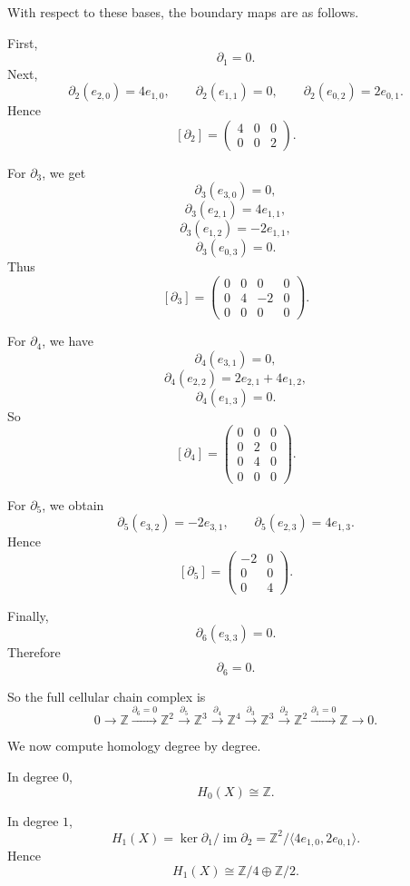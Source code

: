 \begin{solution}
With respect to these bases, the boundary maps are as follows.

First,
\[
\partial_1=0.
\]
Next,
\[
\partial_2(e_{2,0})=4e_{1,0},
\qquad
\partial_2(e_{1,1})=0,
\qquad
\partial_2(e_{0,2})=2e_{0,1}.
\]
Hence
\[
[\partial_2]
=
\begin{pmatrix}
	4 & 0 & 0\\
	0 & 0 & 2
\end{pmatrix}.
\]

For \(\partial_3\), we get
\[
\partial_3(e_{3,0})=0,
\]
\[
\partial_3(e_{2,1})=4e_{1,1},
\]
\[
\partial_3(e_{1,2})=-2e_{1,1},
\]
\[
\partial_3(e_{0,3})=0.
\]
Thus
\[
[\partial_3]
=
\begin{pmatrix}
	0 & 0 & 0 & 0\\
	0 & 4 & -2 & 0\\
	0 & 0 & 0 & 0
\end{pmatrix}.
\]

For \(\partial_4\), we have
\[
\partial_4(e_{3,1})=0,
\]
\[
\partial_4(e_{2,2})
=
2e_{2,1}+4e_{1,2},
\]
\[
\partial_4(e_{1,3})=0.
\]
So
\[
[\partial_4]
=
\begin{pmatrix}
	0 & 0 & 0\\
	0 & 2 & 0\\
	0 & 4 & 0\\
	0 & 0 & 0
\end{pmatrix}.
\]

For \(\partial_5\), we obtain
\[
\partial_5(e_{3,2})=-2e_{3,1},
\qquad
\partial_5(e_{2,3})=4e_{1,3}.
\]
Hence
\[
[\partial_5]
=
\begin{pmatrix}
	-2 & 0\\
	0 & 0\\
	0 & 4
\end{pmatrix}.
\]

Finally,
\[
\partial_6(e_{3,3})=0.
\]
Therefore
\[
\partial_6=0.
\]

So the full cellular chain complex is
\[
0
\longrightarrow
\mathbb Z
\xrightarrow{\partial_6=0}
\mathbb Z^2
\xrightarrow{\partial_5}
\mathbb Z^3
\xrightarrow{\partial_4}
\mathbb Z^4
\xrightarrow{\partial_3}
\mathbb Z^3
\xrightarrow{\partial_2}
\mathbb Z^2
\xrightarrow{\partial_1=0}
\mathbb Z
\longrightarrow 0.
\]

We now compute homology degree by degree.

In degree \(0\),
\[
H_0(X)\cong \mathbb Z.
\]

In degree \(1\),
\[
H_1(X)
=
\ker \partial_1/\operatorname{im}\partial_2
=
\mathbb Z^2/\langle 4e_{1,0},2e_{0,1}\rangle.
\]
Hence
\[
H_1(X)\cong \mathbb Z/4\oplus \mathbb Z/2.
\]


\end{solution}
